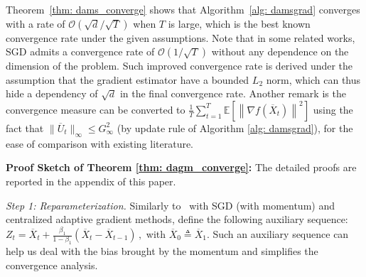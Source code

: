 \documentclass[11pt]{article}
\newtheorem{lemma}{Lemma}
\begin{document}
Theorem~\ref{thm: dams_converge} shows that Algorithm~\ref{alg: damsgrad} converges with a rate of  $\mathcal{O}(\sqrt{d}/\sqrt{T})$ when $T$ is large, which is the best known convergence rate under the given assumptions. 
Note that in some related works, SGD admits a convergence rate of $\mathcal{O}(1/\sqrt{T})$ without any dependence on the dimension of the problem.
Such improved convergence rate is derived under the assumption that the gradient estimator have a bounded $L_2$ norm, which can thus hide a dependency of $\sqrt{d}$ in the final convergence rate. {Another remark is the convergence measure can be converted to $\frac{1}{T}\sum_{t=1}^T  \mathbb E \left [\left\|{\nabla f( \overline X_{t})}\right\|^2  \right]$
using the fact that $\|\overline U_{t}\|_{\infty} \leq G_{\infty}^2$  (by update rule of Algorithm \ref{alg: damsgrad}), for the ease of comparison with existing literature.}


\vspace{0.05in}

\textbf{Proof Sketch of Theorem \ref{thm: dagm_converge}:} The detailed proofs are reported in the appendix of this paper.

\textsl{Step 1: Reparameterization.} \hspace{0.01in} Similarly to~\cite{yan2018unified, chen2018convergence} with SGD (with momentum) and centralized adaptive gradient methods, define the following auxiliary sequence:
 $
 Z_{t} = \overline X_t + \frac{\beta_1}{1-\beta_1} (\overline X_t - \overline X_{t-1}) \, ,
 $
with $\overline X_{0} \triangleq \overline X_1$.
Such an auxiliary sequence can help us deal with the bias brought by the momentum and simplifies the convergence analysis. 
 
\end{document}
